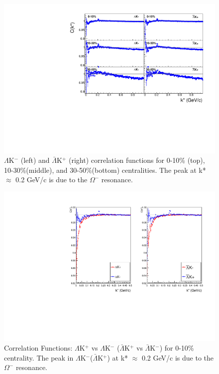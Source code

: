 \documentclass[../AnalysisNoteJBuxton.tex]{subfiles}
\begin{document}
\begin{figure}[h]
  \centering
  \includegraphics[width=\textwidth]{4_CorrelationFunctions/Figures/canKStarCfsLamKchMwConj.pdf}
  \caption[$\Lambda$K$^{-}$ and $\bar{\Lambda}$K$^{+}$ Correlation Functions]{$\Lambda$K$^{-}$ (left) and $\bar{\Lambda}$K$^{+}$ (right) correlation functions for 0-10\% (top), 10-30\%(middle), and 30-50\%(bottom) centralities.  The peak at k* $\approx$ 0.2 GeV/c is due to the $\Omega^{-}$ resonance.}
  \label{fig:LamKchMwConjCfs}
\end{figure}

\begin{figure}[h]
  \centering
  \includegraphics[width=\textwidth]{4_CorrelationFunctions/Figures/canKStarCfLamKchP_0010.pdf}
  \caption[Correlation Functions: $\Lambda$K$^{+}$ vs $\Lambda$K$^{-}$ for 0-10\% Centrality]{Correlation Functions: $\Lambda$K$^{+}$ vs $\Lambda$K$^{-}$ ($\bar{\Lambda}$K$^{+}$ vs $\bar{\Lambda}$K$^{-}$) for 0-10\% centrality.  The peak in $\Lambda$K$^{-}$($\bar{\Lambda}$K$^{+}$) at k* $\approx$ 0.2 GeV/c is due to the $\Omega^{-}$ resonance.}
  \label{fig:cLamcKchCfs0010}
\end{figure}
\end{document}
